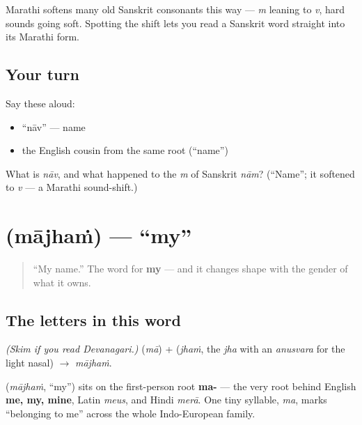 \begin{culture}
Marathi softens many old Sanskrit consonants this way — \emph{m} leaning to \emph{v}, hard sounds going soft. Spotting the shift lets you read a Sanskrit word straight into its Marathi form.
\end{culture}

\subsection*{Your turn}
Say these aloud:

\begin{itemize}
\raggedright
  \item \textquotedblleft{}nāv\textquotedblright{} — name
  \item the English cousin from the same root (\textquotedblleft{}name\textquotedblright{})
\end{itemize}

\begin{tcolorbox}[breakable,colback=teal!4,colframe=teal!35!black,title={Before you move on}]
What is \emph{nāv}, and what happened to the \emph{m} of Sanskrit \emph{nām}? (\textquotedblleft{}Name\textquotedblright{}; it softened to \emph{v} — a Marathi sound-shift.)
\end{tcolorbox}
\section[\texorpdfstring{\mr{माझं} (mājhaṁ)}{माझं (mājhaṁ)}]{ (mājhaṁ) — \textquotedblleft{}my\textquotedblright{}}

\label{lesson:MR-C02-majhe}



\begin{quote}
\textquotedblleft{}My name.\textquotedblright{} The word for \textbf{my} — and it changes shape with the gender of what it owns.
\end{quote}

\subsection*{The letters in this word}
\emph{(Skim if you read Devanagari.)} \textbf{} (\emph{mā}) + \textbf{} (\emph{jhaṁ}, the  \emph{jha} with an \emph{anusvara} \textbf{} for the light nasal) $\to$ \textbf{} \emph{mājhaṁ}.

\begin{cousinweb}
\textbf{} (\emph{mājhaṁ}, \textquotedblleft{}my\textquotedblright{}) sits on the first-person root \textbf{ma-} — the very root behind English \textbf{me, my, mine}, Latin \emph{meus}, and Hindi \emph{merā}. One tiny syllable, \emph{ma}, marks \textquotedblleft{}belonging to me\textquotedblright{} across the whole Indo-European family.
\end{cousinweb}

